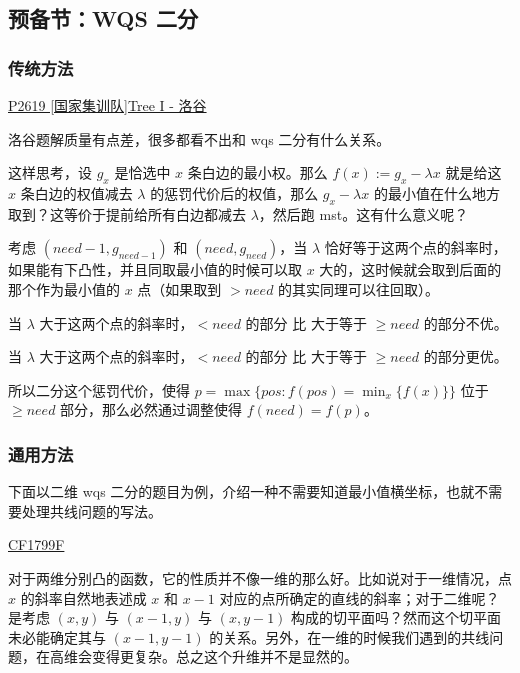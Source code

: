 \subsection{预备节：WQS 二分}

\subsubsection{传统方法}

\href{https://www.luogu.com.cn/problem/P2619}{P2619 [国家集训队]Tree I - 洛谷}

洛谷题解质量有点差，很多都看不出和 wqs 二分有什么关系。

这样思考，设 $g_x$ 是恰选中 $x$ 条白边的最小权。那么 $f(x) := g_x - \lambda x$ 就是给这 $x$ 条白边的权值减去 $\lambda$ 的惩罚代价后的权值，那么 $g_x-\lambda x$ 的最小值在什么地方取到？这等价于提前给所有白边都减去 $\lambda$，然后跑 mst。这有什么意义呢？

考虑 $(need-1, g_{need-1})$ 和 $(need, g_{need})$，当 $\lambda$ 恰好等于这两个点的斜率时，如果能有下凸性，并且同取最小值的时候可以取 $x$ 大的，这时候就会取到后面的那个作为最小值的 $x$ 点（如果取到 $>need$ 的其实同理可以往回取）。

当 $\lambda$ 大于这两个点的斜率时，$< need$ 的部分 比 大于等于 $\ge need$ 的部分不优。

当 $\lambda$ 大于这两个点的斜率时，$< need$ 的部分 比 大于等于 $\ge need$ 的部分更优。

所以二分这个惩罚代价，使得 $p = \max\{pos : f(pos) = \min_{x}\{f(x)\}\}$ 位于 $\ge need$ 部分，那么必然通过调整使得 $f(need) = f(p)$。




\subsubsection{通用方法}

下面以二维 wqs 二分的题目为例，介绍一种不需要知道最小值横坐标，也就不需要处理共线问题的写法。

\href{https://codeforces.com/problemset/problem/1799/F}{CF1799F}

对于两维分别凸的函数，它的性质并不像一维的那么好。比如说对于一维情况，点 $x$ 的斜率自然地表述成 $x$ 和 $x-1$ 对应的点所确定的直线的斜率；对于二维呢？是考虑 $(x,y)$ 与 $(x-1,y)$ 与 $(x,y-1)$ 构成的切平面吗？然而这个切平面未必能确定其与 $(x-1,y-1)$ 的关系。另外，在一维的时候我们遇到的共线问题，在高维会变得更复杂。总之这个升维并不是显然的。

